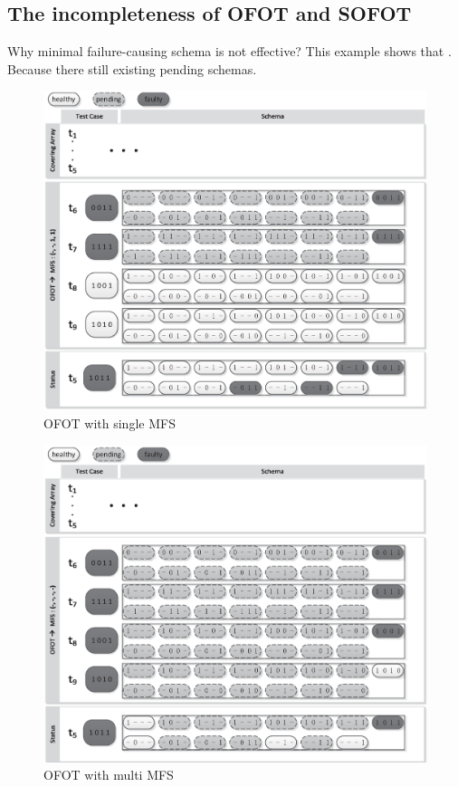 \subsection{The incompleteness of OFOT and SOFOT}
Why minimal failure-causing schema is not effective?
This example shows that . Because there still existing pending schemas.
\begin{figure}[ht]
 \centering
 \includegraphics[width=5.6in]{ofot_single.eps}
 \caption{OFOT with single MFS}
 \label{fig_ofot_single}
\end{figure}

\begin{figure}[ht]
 \centering
 \includegraphics[width=5.6in]{ofot_multi.eps}
 \caption{OFOT with multi MFS}
 \label{fig_ofot_multi}
\end{figure}



